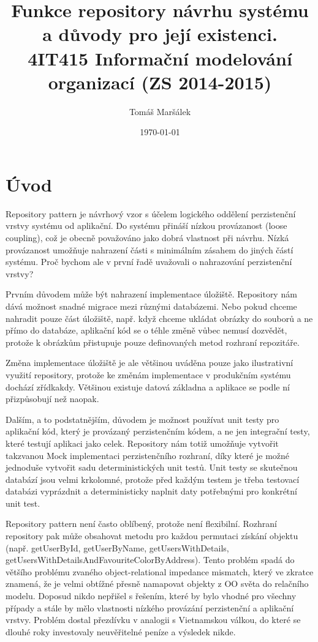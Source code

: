 \documentclass[11pt]{article}
\title{Funkce repository návrhu systému a důvody pro její existenci. \\ 4IT415 Informační modelování organizací (ZS 2014-2015)}
\author{Tomáš Maršálek}
\date{\today}
\begin{document}
\maketitle
\thispagestyle{empty}
\clearpage

\section{Úvod}
Repository pattern je návrhový vzor s účelem logického oddělení perzistenční
vrstvy systému od aplikační. Do systému přináší nízkou provázanost (loose
coupling), což je obecně považováno jako dobrá vlastnost při návrhu. Nízká
provázanost umožňuje nahrazení části s minimálním zásahem do jiných částí
systému. Proč bychom ale v první řadě uvažovali o nahrazování perzistenční
vrstvy?

Prvním důvodem může být nahrazení implementace úložiště. Repository nám dává
možnost snadné migrace mezi různými databázemi. Nebo pokud chceme nahradit
pouze část úložiště, např. když chceme ukládat obrázky do souborů a ne přímo do
databáze, aplikační kód se o téhle změně vůbec nemusí dozvědět, protože k
obrázkům přistupuje pouze definovaných metod rozhraní repozitáře.

Změna implementace úložiště je ale většinou uváděna pouze jako ilustrativní
využití repository, protože ke změnám implementace v produkčním systému dochází
zřídkakdy. Většinou existuje datová základna a aplikace se podle ní
přizpůsobují než naopak.

Dalším, a to podstatnějším, důvodem je možnost používat unit testy pro
aplikační kód, který je provázaný perzistenčním kódem, a ne jen integrační
testy, které testují aplikaci jako celek. Repository nám totiž umožňuje
vytvořit takzvanou Mock implementaci perzistenčního rozhraní, díky které je
možné jednoduše vytvořit sadu deterministických unit testů. Unit testy se
skutečnou databází jsou velmi krkolomné, protože před každým testem je třeba
testovací databázi vyprázdnit a deterministicky naplnit daty potřebnými pro
konkrétní unit test.

Repository pattern není často oblíbený, protože není flexibilní. Rozhraní
repository pak může obsahovat metodu pro každou permutaci získání objektu
(např. getUserById, getUserByName, getUsersWithDetails,
getUsersWithDetailsAndFavouriteColorByAddress). Tento problém spadá do většího
problému zvaného object-relational impedance mismatch, který ve zkratce
znamená, že je velmi obtížné přesně namapovat objekty z OO světa do relačního
modelu. Doposud nikdo nepřišel s řešením, které by bylo vhodné pro všechny
případy a stále by mělo vlastnosti nízkého provázání perzistenční a aplikační
vrstvy. Problém dostal přezdívku  v analogii s
Vietnamskou válkou, do které se dlouhé roky investovaly neuvěřitelné peníze a
výsledek nikde. 
\end{document}

